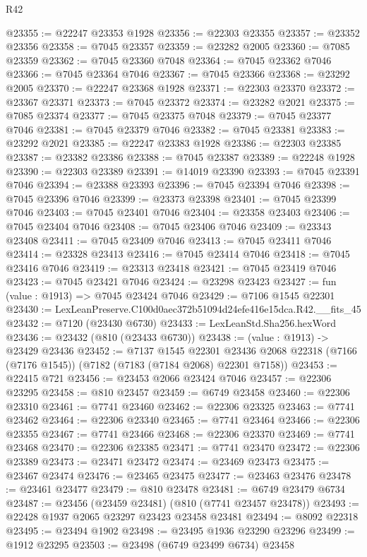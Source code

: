 \begin{lexlean}{R42}
\begin{coremodule}
{@23355 := @22247 @23353 @1928
@23356 := @22303 @23355
@23357 := @23352 @23356
@23358 := @7045 @23357
@23359 := @23282 @2005
@23360 := @7085 @23359
@23362 := @7045 @23360 @7048
@23364 := @7045 @23362 @7046
@23366 := @7045 @23364 @7046
@23367 := @7045 @23366
@23368 := @23292 @2005
@23370 := @22247 @23368 @1928
@23371 := @22303 @23370
@23372 := @23367 @23371
@23373 := @7045 @23372
@23374 := @23282 @2021
@23375 := @7085 @23374
@23377 := @7045 @23375 @7048
@23379 := @7045 @23377 @7046
@23381 := @7045 @23379 @7046
@23382 := @7045 @23381
@23383 := @23292 @2021
@23385 := @22247 @23383 @1928
@23386 := @22303 @23385
@23387 := @23382 @23386
@23388 := @7045 @23387
@23389 := @22248 @1928
@23390 := @22303 @23389
@23391 := @14019 @23390
@23393 := @7045 @23391 @7046
@23394 := @23388 @23393
@23396 := @7045 @23394 @7046
@23398 := @7045 @23396 @7046
@23399 := @23373 @23398
@23401 := @7045 @23399 @7046
@23403 := @7045 @23401 @7046
@23404 := @23358 @23403
@23406 := @7045 @23404 @7046
@23408 := @7045 @23406 @7046
@23409 := @23343 @23408
@23411 := @7045 @23409 @7046
@23413 := @7045 @23411 @7046
@23414 := @23328 @23413
@23416 := @7045 @23414 @7046
@23418 := @7045 @23416 @7046
@23419 := @23313 @23418
@23421 := @7045 @23419 @7046
@23423 := @7045 @23421 @7046
@23424 := @23298 @23423
@23427 := fun (value : @1913) => @7045 @23424 @7046
@23429 := @7106 @1545 @22301
@23430 := LexLeanPreserve.C100d0aec372b51094d24efe416e15dca.R42.__fits_45
@23432 := @7120 (@23430 @6730)
@23433 := LexLeanStd.Sha256.hexWord
@23436 := @23432 (@810 (@23433 @6730))
@23438 := (value : @1913) -> @23429 @23436
@23452 := @7137
    @1545
    @22301
    @23436
    @2068
    @22318
    (@7166 (@7176 @1545))
    (@7182 (@7183 (@7184 @2068) @22301 @7158))
@23453 := @22415 @721
@23456 := @23453 @2066 @23424 @7046
@23457 := @22306 @23295
@23458 := @810 @23457
@23459 := @6749 @23458
@23460 := @22306 @23310
@23461 := @7741 @23460
@23462 := @22306 @23325
@23463 := @7741 @23462
@23464 := @22306 @23340
@23465 := @7741 @23464
@23466 := @22306 @23355
@23467 := @7741 @23466
@23468 := @22306 @23370
@23469 := @7741 @23468
@23470 := @22306 @23385
@23471 := @7741 @23470
@23472 := @22306 @23389
@23473 := @23471 @23472
@23474 := @23469 @23473
@23475 := @23467 @23474
@23476 := @23465 @23475
@23477 := @23463 @23476
@23478 := @23461 @23477
@23479 := @810 @23478
@23481 := @6749 @23479 @6734
@23487 := @23456 (@23459 @23481) (@810 (@7741 @23457 @23478))
@23493 := @22428 @1937 @2065 @23297 @23423 @23458 @23481
@23494 := @8092 @22318
@23495 := @23494 @1902
@23498 := @23495 @1936 @23290 @23296
@23499 := @1912 @23295
@23503 := @23498 (@6749 @23499 @6734) @23458
}
\end{coremodule}
\end{lexlean}
